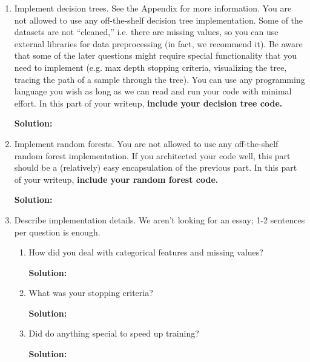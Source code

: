 \documentclass{article}
\newcommand{\solution}{\textbf{Solution: }}
\begin{document}
\begin{enumerate}
    \item Implement decision trees. See the Appendix for more information. You are not allowed to use any off-the-shelf decision tree implementation. Some of the datasets are not “cleaned,” i.e. there are missing values, so you can use external libraries for data preprocessing (in fact, we recommend it). Be aware that some of the later questions might require special functionality that you need to implement (e.g. max depth stopping criteria, visualizing the tree, tracing the path of a sample through the tree). You can use any programming language you wish as long as we can read and run your code with minimal effort. In this part of your writeup, \textbf{include your decision tree code.}
    \begin{mdframed}\solution
    \end{mdframed}

    \item Implement random forests. You are not allowed to use any off-the-shelf random forest implementation. If you architected your code well, this part should be a (relatively) easy encapsulation of the previous part. In this part of your writeup, \textbf{include your random forest code.}
    \begin{mdframed}\solution
    \end{mdframed}

    \item Describe implementation details. We aren’t looking for an essay; 1-2 sentences per question is enough.
    \begin{enumerate}
        \item How did you deal with categorical features and missing values?
        \begin{mdframed} \solution
        \end{mdframed}

        \item What was your stopping criteria?
        \begin{mdframed} \solution
        \end{mdframed}

        \item Did do anything special to speed up training?
        \begin{mdframed} \solution
        \end{mdframed}


\end{enumerate}
\end{enumerate}
\end{document}

